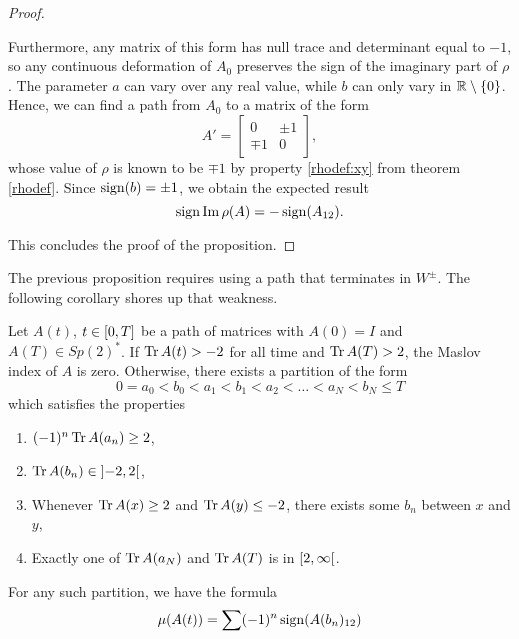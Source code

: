 \begin{proof}
\begin{lemmaproof}
Furthermore, any matrix of this form has null trace and determinant equal to $-1$, so any continuous deformation of $A_0$ preserves the sign of the imaginary part of $\rho$. The parameter $a$ can vary over any real value, while $b$ can only vary in $\mathbb{R} \setminus \{0\}$. Hence, we can find a path from $A_0$ to a matrix of the form
\begin{equation}
A' = \begin{bmatrix}
0 & \pm 1\\
\mp 1 & 0
\end{bmatrix},
\end{equation}
whose value of $\rho$ is known to be $\mp 1$ by property \ref{rhodef:xy} from theorem \ref{rhodef}. Since $\operatorname{sign}(b) = \pm 1$, we obtain the expected result
\begin{equation}
\operatorname{sign} \operatorname{Im} \rho(A) = - \operatorname{sign}(A_{12}).
\end{equation}
\end{lemmaproof}
This concludes the proof of the proposition.
\end{proof}

The previous proposition requires using a path that terminates in $W^\pm$. The following corollary shores up that weakness.

\begin{corollary}\label{calcmaslov1}
Let $A(t)$, $t \in \interval 0 T$ be a path of matrices with $A(0) = I$ and $A(T) \in Sp(2)^*$. If $\operatorname{Tr} A(t) > -2$ for all time and $\operatorname{Tr} A(T) > 2$, the Maslov index of $A$ is zero. Otherwise, there exists a partition of the form
\begin{equation}
0 = a_0 < b_0 < a_1 < b_1 < a_2 < \dots < a_N < b_N \leq T
\end{equation}
which satisfies the properties
\begin{enumerate}
\item $(-1)^n \operatorname{Tr} A(a_n) \geq 2$,
\item $\trace A(b_n) \in \ointerval{-2}2$,
\item Whenever $\operatorname{Tr} A(x) \geq 2$ and $\operatorname{Tr} A(y) \leq -2$, there exists some $b_n$ between $x$ and $y$,
\item\label{calcmaslov:ab5} Exactly one of $\operatorname{Tr} A(a_N)$ and $\operatorname{Tr} A(T)$ is in $\rinterval 2 \infty$.
\end{enumerate}

For any such partition, we have the formula
\begin{equation}\label{calcmaslov:mu}
\mu(A(t)) = \sum (-1)^n \operatorname{sign}(A(b_n)_{12})
\end{equation}
\end{corollary}

